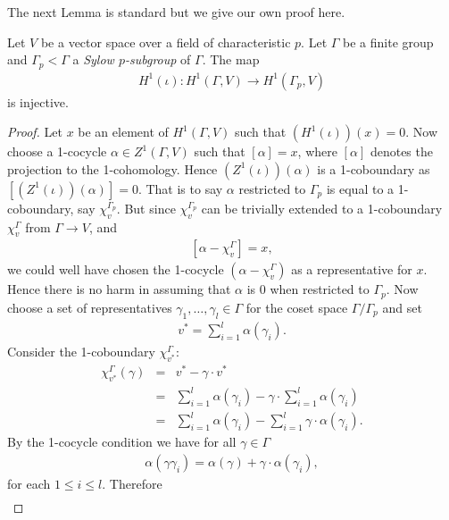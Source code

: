 The next Lemma is standard \cite[Theorem 10.3]{brown1976cohomology} but we give our own proof here.
\begin{lemma}
Let $V$ be a vector space over a field of characteristic $p$. Let $\Gamma$ be a finite group and $\Gamma_p < \Gamma$ a \emph{Sylow $p$-subgroup} of $\Gamma$. The map 
\begin{eqnarray*}
H^1(\iota):H^1(\Gamma, V)\rightarrow H^1(\Gamma_p, V)
\end{eqnarray*}
is injective.
\label{lem:a_h_restriction}
\end{lemma}
\begin{proof}
Let $x$ be an element of $H^1(\Gamma, V)$ such that $\left(H^1(\iota)\right)(x) = 0$. Now choose a 1-cocycle $\alpha \in Z^1(\Gamma, V)$ such that $[\alpha] = x$, where $[\alpha]$ denotes the projection to the 1-cohomology. Hence $\left(Z^1(\iota)\right)(\alpha)$ is a 1-coboundary as $\left[\left(Z^1(\iota)\right)(\alpha)\right] = 0$. That is to say $\alpha$ restricted to $\Gamma_p$ is equal to a 1-coboundary, say $\chi_v^{\Gamma_p}$. But since $\chi_v^{\Gamma_p}$ can be trivially extended to a 1-coboundary $\chi_v^\Gamma$ from $\Gamma\rightarrow V$, and \begin{eqnarray*}
	\left[\alpha - \chi_v^\Gamma\right] = x,
\end{eqnarray*}
we could well have chosen the 1-cocycle $(\alpha - \chi_v^\Gamma)$ as a representative for $x$. Hence there is no harm in assuming that $\alpha$ is 0 when restricted to $\Gamma_p$.
Now choose a set of representatives $\gamma_1, \ldots, \gamma_l \in \Gamma$ for the coset space $\Gamma/\Gamma_p$ and set
\begin{eqnarray*}
	v^* = \sum_{i =1}^l \alpha(\gamma_i).
\end{eqnarray*}
Consider the 1-coboundary $\chi_{v^*}^\Gamma$:
\begin{eqnarray*}
	\chi_{v^*}^\Gamma(\gamma) &=& v^* - \gamma\cdot v^* \\
	&=& \sum_{i = 1}^l\alpha(\gamma_i) - \gamma\cdot \sum_{i = 1}^l\alpha(\gamma_i) \\
	&=& \sum_{i = 1}^l\alpha(\gamma_i) - \sum_{i = 1}^l \gamma\cdot \alpha(\gamma_i).
\end{eqnarray*}
By the 1-cocycle condition we have for all $\gamma \in \Gamma$
\begin{eqnarray*}
	\alpha(\gamma \gamma_i) = \alpha(\gamma) + \gamma\cdot\alpha(\gamma_i),
\end{eqnarray*}
for each $1 \leq i \leq l$. Therefore
\begin{eqnarray*}

\end{eqnarray*}
\end{proof}
